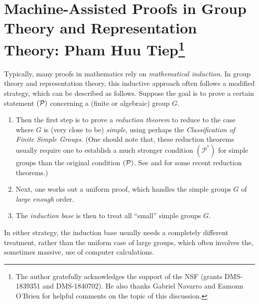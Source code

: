 \section{Machine-Assisted Proofs in Group Theory and Representation Theory:
Pham Huu Tiep\protect\footnote{The author gratefully acknowledges the support of the NSF (grants DMS-1839351 and DMS-1840702). He also thanks 
Gabriel Navarro and Eamonn O'Brien for helpful comments on the topic of this discussion.}}





Typically, many proofs in mathematics rely on {\it mathematical induction}. In group theory and representation theory,
this inductive approach often follows a modified strategy, which can be described as follows. Suppose the goal is to prove a 
certain statement $({\mathcal P})$ concerning a (finite or algebraic) group $G$. 

\begin{enumerate}[\rm(i)]
\item Then the first step is to prove a {\it reduction theorem}
to reduce to the case where $G$ is (very close to be) {\it simple}, using perhaps the
{\it Classification of Finite Simple Groups}. (One should note that, these reduction theorems usually require one to 
establish a much stronger condition $({\mathcal P}^*)$ for simple groups than the original condition $({\mathcal P})$. 
See \cite{IMN} and \cite{NT} for some recent reduction theorems.)

\item Next, one works out a uniform proof, which handles the simple groups $G$ of {\it large enough} order.


\item The {\it induction base} is then to treat all ``small'' simple groups $G$.
\end{enumerate}

In either strategy, the induction base usually needs a completely different treatment, rather than the uniform case of large groups,
which often involves the, sometimes massive, use of computer calculations.
 
